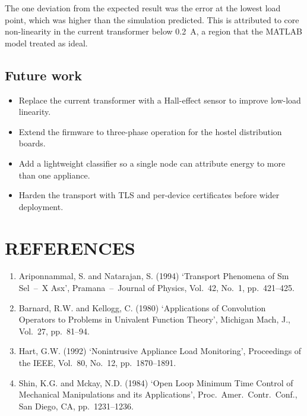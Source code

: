 \documentclass[12pt,a4paper]{report}
\begin{document}
The one deviation from the expected result was the error at the lowest load
point, which was higher than the simulation predicted. This is attributed to
core non-linearity in the current transformer below 0.2~A, a region that the
MATLAB model treated as ideal.

\section{Future work}

\begin{itemize}
  \item Replace the current transformer with a Hall-effect sensor to improve low-load linearity.
  \item Extend the firmware to three-phase operation for the hostel distribution boards.
  \item Add a lightweight classifier so a single node can attribute energy to more than one appliance.
  \item Harden the transport with TLS and per-device certificates before wider deployment.
\end{itemize}

\chapter*{REFERENCES}

\begin{singlespace}
\begin{enumerate}[leftmargin=1.4cm]
  \item Ariponnammal, S. and Natarajan, S. (1994) `Transport Phenomena of Sm Sel~--~X Asx', Pramana~--~Journal of Physics, Vol.~42, No.~1, pp.~421--425.
  \item Barnard, R.W. and Kellogg, C. (1980) `Applications of Convolution Operators to Problems in Univalent Function Theory', Michigan Mach, J., Vol.~27, pp.~81--94.
  \item Hart, G.W. (1992) `Nonintrusive Appliance Load Monitoring', Proceedings of the IEEE, Vol.~80, No.~12, pp.~1870--1891.
  \item Shin, K.G. and Mckay, N.D. (1984) `Open Loop Minimum Time Control of Mechanical Manipulations and its Applications', Proc.~Amer.~Contr.~Conf., San Diego, CA, pp.~1231--1236.
\end{enumerate}
\end{singlespace}
\end{document}

